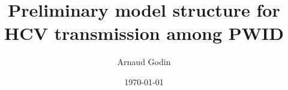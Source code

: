 \documentclass[11pt]{article}
\begin{document}
\title{Preliminary model structure for HCV transmission among PWID}
\author{Arnaud Godin}
\date{\today}
\end{document}
